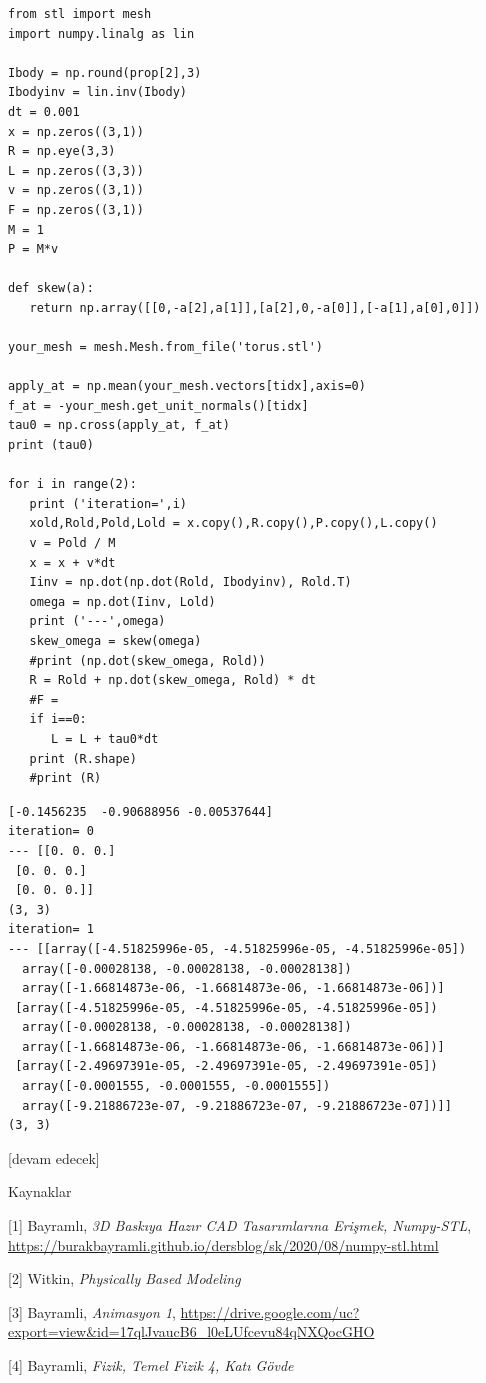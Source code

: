 \documentclass[12pt,fleqn]{article}\usepackage{../../common}
\begin{document}
\begin{verbatim}
from stl import mesh
import numpy.linalg as lin

Ibody = np.round(prop[2],3)
Ibodyinv = lin.inv(Ibody)
dt = 0.001
x = np.zeros((3,1))
R = np.eye(3,3)
L = np.zeros((3,3))
v = np.zeros((3,1))
F = np.zeros((3,1))
M = 1
P = M*v

def skew(a):
   return np.array([[0,-a[2],a[1]],[a[2],0,-a[0]],[-a[1],a[0],0]])

your_mesh = mesh.Mesh.from_file('torus.stl')
   
apply_at = np.mean(your_mesh.vectors[tidx],axis=0)
f_at = -your_mesh.get_unit_normals()[tidx]
tau0 = np.cross(apply_at, f_at)
print (tau0)

for i in range(2):
   print ('iteration=',i)
   xold,Rold,Pold,Lold = x.copy(),R.copy(),P.copy(),L.copy()
   v = Pold / M
   x = x + v*dt
   Iinv = np.dot(np.dot(Rold, Ibodyinv), Rold.T)   
   omega = np.dot(Iinv, Lold)
   print ('---',omega)
   skew_omega = skew(omega)
   #print (np.dot(skew_omega, Rold))
   R = Rold + np.dot(skew_omega, Rold) * dt
   #F =
   if i==0:      
      L = L + tau0*dt
   print (R.shape)
   #print (R)
\end{verbatim}

\begin{verbatim}
[-0.1456235  -0.90688956 -0.00537644]
iteration= 0
--- [[0. 0. 0.]
 [0. 0. 0.]
 [0. 0. 0.]]
(3, 3)
iteration= 1
--- [[array([-4.51825996e-05, -4.51825996e-05, -4.51825996e-05])
  array([-0.00028138, -0.00028138, -0.00028138])
  array([-1.66814873e-06, -1.66814873e-06, -1.66814873e-06])]
 [array([-4.51825996e-05, -4.51825996e-05, -4.51825996e-05])
  array([-0.00028138, -0.00028138, -0.00028138])
  array([-1.66814873e-06, -1.66814873e-06, -1.66814873e-06])]
 [array([-2.49697391e-05, -2.49697391e-05, -2.49697391e-05])
  array([-0.0001555, -0.0001555, -0.0001555])
  array([-9.21886723e-07, -9.21886723e-07, -9.21886723e-07])]]
(3, 3)
\end{verbatim}




[devam edecek]

Kaynaklar

[1] Bayramlı, {\em 3D Baskıya Hazır CAD Tasarımlarına Erişmek, Numpy-STL},
    \url{https://burakbayramli.github.io/dersblog/sk/2020/08/numpy-stl.html}

[2] Witkin, {\em Physically Based Modeling}

[3] Bayramli, {\em Animasyon 1},
    \url{https://drive.google.com/uc?export=view&id=17qlJvaucB6_l0eLUfcevu84qNXQocGHO}

[4] Bayramli, {\em Fizik, Temel Fizik 4, Katı Gövde}
    
\end{document}
